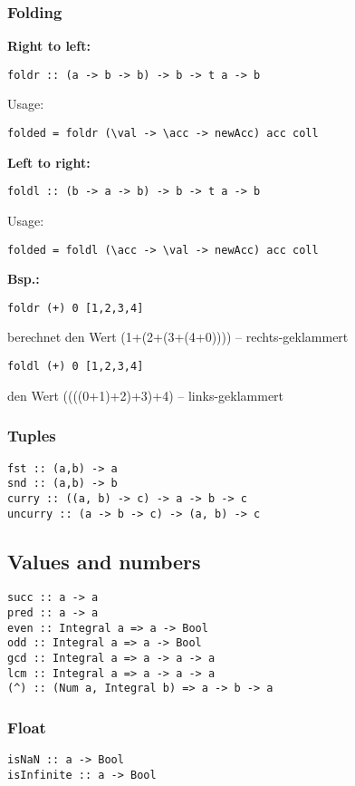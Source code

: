 \subsubsection{Folding}

\textbf{Right to left:}
\begin{verbatim}
foldr :: (a -> b -> b) -> b -> t a -> b
\end{verbatim}
Usage:
\begin{verbatim}
folded = foldr (\val -> \acc -> newAcc) acc coll
\end{verbatim}
\textbf{Left to right:} 
\begin{verbatim}
foldl :: (b -> a -> b) -> b -> t a -> b
\end{verbatim}
Usage:
\begin{verbatim}
folded = foldl (\acc -> \val -> newAcc) acc coll
\end{verbatim}
\textbf{Bsp.:}
\begin{verbatim}
foldr (+) 0 [1,2,3,4]
\end{verbatim}
berechnet den Wert (1+(2+(3+(4+0)))) – rechts-geklammert 
\begin{verbatim}
foldl (+) 0 [1,2,3,4]
\end{verbatim}
den Wert ((((0+1)+2)+3)+4) – links-geklammert\\
\subsubsection{Tuples}
\begin{verbatim}
fst :: (a,b) -> a
snd :: (a,b) -> b
curry :: ((a, b) -> c) -> a -> b -> c
uncurry :: (a -> b -> c) -> (a, b) -> c
\end{verbatim}
\subsection{Values and numbers}
\begin{verbatim}
succ :: a -> a
pred :: a -> a
even :: Integral a => a -> Bool
odd :: Integral a => a -> Bool
gcd :: Integral a => a -> a -> a
lcm :: Integral a => a -> a -> a
(^) :: (Num a, Integral b) => a -> b -> a 
\end{verbatim}
\subsubsection{Float}
\begin{verbatim}
isNaN :: a -> Bool
isInfinite :: a -> Bool
\end{verbatim}
